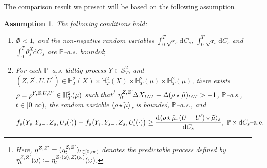 \documentclass[10pt]{article} %
\newtheorem{assumption}[theorem]{Assumption}
\newcommand\cS{\mathcal S}
\newcommand{\smalltext}[1]{\text{\fontsize{4}{4}\selectfont$#1$}}
\def \H{\mathbb{H}}
\def \P{\mathbb{P}}
\newcommand{\1}{\mathbf{1}}
\def\d{\mathrm{d}}
\begin{document}
The comparison result we present will be based on the following assumption.

\begin{assumption}\label{ass::comparison}
	The following conditions hold:
	\begin{enumerate}
		\item[$(i)$] $\Phi < 1$, and the non-negative random variables $\int_0^T \sqrt{r_s} \d C_s$, $\int_0^T \sqrt{\mathrm{r}_s} \d C_s$ and $\int_0^T \theta^X_s \d C_s$ are $\P$--{\rm a.s.} bounded$;$
		\item[$(ii)$] For each $\P$--{\rm a.s.} l\`adl\`ag process $Y \in \cS^2_T$,  and $(Z,Z^\prime,U,U^\prime) \in \H^2_T(X) \times \H^2_T(X) \times \H^2_T(\mu) \times \H^2_T(\mu)$, there exists $\rho = \rho^{Y,Z,U,U^\smalltext{\prime}} \in \H^2_T(\mu)$ such that\footnote{Here, $\eta^{Z,Z^\smalltext{\prime}} = (\eta^{Z,Z^\smalltext{\prime}}_t)_{t \in [0,\infty)}$ denotes the predictable process defined by $\eta^{Z,Z^\smalltext{\prime}}_t(\omega) \coloneqq \eta^{Z_t(\omega),Z^\smalltext{\prime}_t(\omega)}_t(\omega)$.} $\eta^{Z,Z^\smalltext{\prime}}_t\Delta X_{t \land T} + \Delta (\rho \star \tilde\mu)_{t \land T} > -1$, $\P$--{\rm a.s.}, $t \in [0,\infty)$, the random variable $\langle \rho \star \tilde\mu\rangle_T$ is bounded, $\P$--{\rm a.s.}, and
			\begin{equation}\label{eq::comparison_inequality}
				f_s\big(Y_s,Y_{s-},Z_s,U_s(\cdot)\big) - f_s\big(Y_s,Y_{s-},Z_s,U^\prime_s(\cdot)\big) 
				\geq \frac{\d\langle \rho \star\tilde\mu,(U-U^\prime)\star\tilde\mu\rangle_s}{\d C_s}, \; \text{$\P \times \d C_s$--{\rm a.e.}}
			\end{equation}
	\end{enumerate}
\end{assumption}
\end{document}
